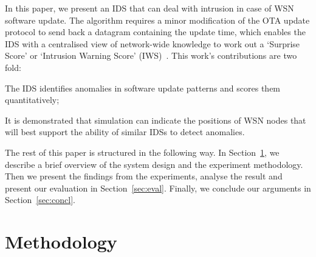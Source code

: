 \documentclass{CRPITStyle}
\renewcommand{\cite}{\citep}
\begin{document}
In this paper, we present an IDS that can deal with intrusion in case of WSN software update.
The algorithm requires a minor modification of the OTA update protocol to send back a datagram containing the update time, 
which enables the IDS with a centralised view of network-wide knowledge to work out a  `Surprise Score' or `Intrusion Warning Score' (IWS)~\cite{aalam15}.
This work's contributions are two fold: 
\begin{inparaenum}
\item  The IDS identifies anomalies in software update patterns and scores them quantitatively;
\item It is demonstrated that simulation can indicate the positions of WSN nodes that will best support the ability of similar IDSs to detect anomalies. 
\end{inparaenum}
The rest of this paper is structured in the following way. 
In Section~\ref{sec:meth}, we describe a brief overview of the system  design and the experiment methodology. 
Then we  present the findings from the experiments, analyse the result and present our evaluation in Section~\ref{sec:eval}.  
Finally, we conclude our arguments in Section~\ref{sec:concl}.


\section{Methodology}
\label{sec:meth}
\end{document}
